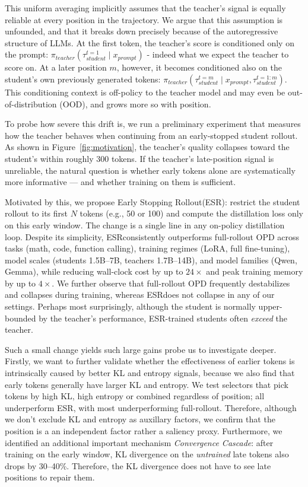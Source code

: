 \documentclass{article}
\newcommand{\method}{ESR}
\newcommand{\methodfull}{Early Stopping Rollout}
\begin{document}
This uniform averaging implicitly assumes that the teacher's signal is equally reliable at every position in the trajectory. We argue that this assumption is unfounded, and that it breaks down precisely because of the autoregressive structure of LLMs. At the first token, the teacher's score is conditioned only on the prompt: $\pi_{teacher}(\tau_{student}^{t=1} \mid x_{prompt})$ - indeed what we expect the teacher to score on. At a later position $m$, however, it becomes conditioned also on the student's own previously generated tokens: $\pi_{teacher}(\tau_{student}^{t=m} \mid x_{prompt}, \tau_{student}^{t=1:m})$. This conditioning context is off-policy to the teacher model and may even be out-of-distribution (OOD), and grows more so with position.

To probe how severe this drift is, we run a preliminary experiment that measures how the teacher behaves when continuing from an early-stopped student rollout. As shown in Figure~\ref{fig:motivation}, the teacher's quality collapses toward the student's within roughly 300 tokens. If the teacher's late-position signal is unreliable, the natural question is whether early tokens alone are systematically more informative --- and whether training on them is sufficient.

Motivated by this, we propose \methodfull (\method): restrict the student rollout to its first $N$ tokens (e.g., 50 or 100) and compute the distillation loss only on this early window. The change is a single line in any on-policy distillation loop. Despite its simplicity, \method consistently outperforms full-rollout OPD across tasks (math, code, function calling), training regimes (LoRA, full fine-tuning), model scales (students 1.5B--7B, teachers 1.7B--14B), and model families (Qwen, Gemma), while reducing wall-clock cost by up to $24\times$ and peak training memory by up to $4\times$. We further observe that full-rollout OPD frequently destabilizes and collapses during training, whereas \method does not collapse in any of our settings. Perhaps most surprisingly, although the student is normally upper-bounded by the teacher's performance, \method-trained students often \emph{exceed} the teacher.

Such a small change yields such large gains probe us to investigate deeper. Firstly, we want to further validate whether the effectiveness of earlier tokens is intrinsically caused by better KL and entropy signals, because we also find that early tokens generally have larger KL and entropy. We test selectors that pick tokens by high KL, high entropy or combined regardless of position; all underperform \method, with most underperforming full-rollout. Therefore, although we don't exclude KL and entropy as auxillary factors, we confirm that the position is a an independent factor rather a saliency proxy. Furthermore, we identified an additional important mechanism  \emph{Convergence Cascade}: after training on the early window, KL divergence on the \emph{untrained} late tokens also drops by 30--40\%. Therefore, the KL divergence does not have to see late positions to repair them.
\end{document}
